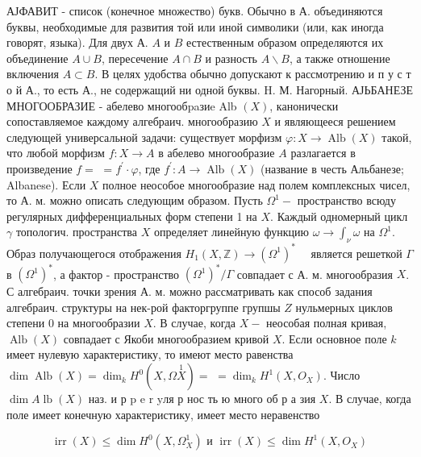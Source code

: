 \documentclass[10pt]{article}
\begin{document}
АЈФАВИТ - список (конечное множество) букв. Обычно в А. объединяются буквы, необходимые для развития той или иной символики (или, как иногда говорят, языка). Для двух А. $A$ и $B$ естественным образом определяются их объединение $A \cup B$, пересечение $A \cap B$ и разность $A \backslash B$, а также отношение включения $A \subset B$. В целях удобства обычно допускают к рассмотрению и п у с т о й А., то есть А., не содержащий ни одной буквы. H. М. Нагорный. АЈЬБАНЕЗЕ МНОГООБРАЗИЕ - абелево многообpaзиe Alb $(X)$, канонически сопоставляемое каждому алгебраич. многообразию $X$ и являющееся решением следующей универсальной задачи: существует морфизм $\varphi: X \rightarrow \operatorname{Alb}(X)$ такой, что любой морфизм $f: X \rightarrow A$ в абелево многообразие $A$ разлагается в произведение $f=$ $=f^{\prime} \cdot \varphi$, где $f^{\prime}: A \rightarrow \operatorname{Alb}(X)$ (название в честь Альбанезе; Albanese). Если $X$ полное неособое многообразие над полем комплексных чисел, то А. м. можно описать следующим образом. Пусть $\Omega^{1}-$ пространство всюду регулярных дифференциальных форм степени 1 на $X$. Каждый одномерный цикл $\gamma$ топологич. пространства $X$ определяет линейную функцию $\omega \rightarrow \int_{\nu} \omega$ на $\Omega^{1}$. Образ получающегося отображения $H_{1}(X, \mathbb{Z}) \rightarrow\left(\Omega^{1}\right)^{*} \quad$ является решеткой $\Gamma$ в $\left(\Omega^{1}\right)^{*}$, а фактор - пространство $\left(\Omega^{1}\right)^{*} / \Gamma$ совпадает с А. м. многообразия $X$. С алгебраич. точки зрения А. м. можно рассматривать как способ задания алгебраич. структуры на нек-рой факторгруппе групшы $Z$ нульмерных циклов степени 0 на многообразии $X$. В случае, когда $X-$ неособая полная кривая, $\operatorname{Alb}(X)$ совпадает с Якоби многообразием кривой $X$. Если основное поле $k$ имеет нулевую характеристику, то имеют место равенства $\operatorname{dim} \operatorname{Alb}(X)=\operatorname{dim}_{k} H^{0}(X, \Omega \stackrel{1}{X})=$ $=\operatorname{dim}_{k} H^{1}\left(X, O_{X}\right)$. Число $\operatorname{dim} A \operatorname{lb}(X)$ наз. и р p e r yля р нос ть ю много об р а зия $X$. В случае, когда поле имеет конечную характеристику, имеет место неравенство



\[

\operatorname{irr}(X) \leqslant \operatorname{dim} H^{0}\left(X, \Omega_{X}^{1}\right) \text { и } \operatorname{irr}(X) \leqslant \operatorname{dim} H^{1}\left(X, O_{X}\right)

\]
\end{document}
